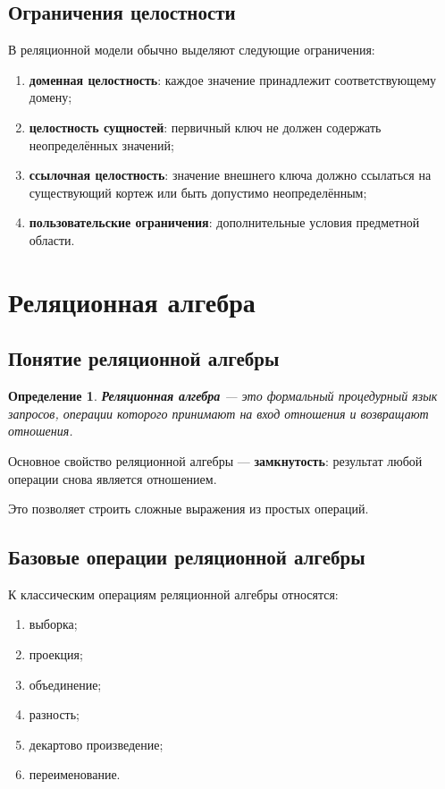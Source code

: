 \documentclass[12pt,a4paper]{article}
\newtheorem{definition}{Определение}[section]
\theoremstyle{remark}
\begin{document}
\subsection{Ограничения целостности}

В реляционной модели обычно выделяют следующие ограничения:
\begin{enumerate}
    \item \textbf{доменная целостность}: каждое значение принадлежит соответствующему домену;
    \item \textbf{целостность сущностей}: первичный ключ не должен содержать неопределённых значений;
    \item \textbf{ссылочная целостность}: значение внешнего ключа должно ссылаться на существующий кортеж или быть допустимо неопределённым;
    \item \textbf{пользовательские ограничения}: дополнительные условия предметной области.
\end{enumerate}

\section{Реляционная алгебра}

\subsection{Понятие реляционной алгебры}

\begin{definition}
\textbf{Реляционная алгебра} --- это формальный процедурный язык запросов, операции которого принимают на вход отношения и возвращают отношения.
\end{definition}

Основное свойство реляционной алгебры --- \textbf{замкнутость}: результат любой операции снова является отношением.

Это позволяет строить сложные выражения из простых операций.

\subsection{Базовые операции реляционной алгебры}

К классическим операциям реляционной алгебры относятся:
\begin{enumerate}
    \item выборка;
    \item проекция;
    \item объединение;
    \item разность;
    \item декартово произведение;
    \item переименование.
\end{enumerate}
\end{document}
